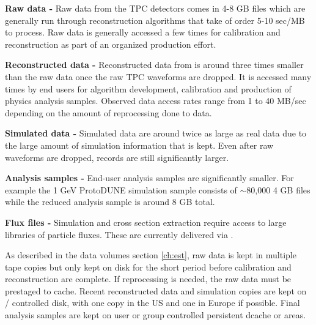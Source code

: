 \documentclass[../main-v1.tex]{subfiles}
\begin{document}
\begin{description}
    \item{\bf Raw data -}  Raw data from the TPC detectors comes in 4-8 GB files which are generally run through reconstruction algorithms that take of order 5-10 sec/MB to process. Raw data is generally accessed a few times for calibration and reconstruction as part of an organized production effort.  
    \item{\bf Reconstructed data -}  Reconstructed data from  is around three times smaller  than the raw data once the raw TPC waveforms are dropped. It is accessed many times by end users for algorithm development, calibration and production of physics analysis samples.   Observed data access rates range from 1 to 40 MB/sec depending on the amount of reprocessing done to data. 
    \item{\bf Simulated data - } Simulated data are around twice as large as real data due to the large amount of simulation information that is kept.  Even after raw waveforms are dropped, records are still significantly larger. 
    \item{\bf Analysis samples - } End-user analysis samples are significantly smaller.  For example the 1 GeV ProtoDUNE simulation sample consists of $\sim$80,000 4 GB files while the reduced analysis sample is around 8 GB total.  
    \item{\bf Flux files - } Simulation and cross section extraction require access to large libraries of particle fluxes.  These are currently delivered via . 
    
\end{description}

As described in the data volumes section \ref{ch:est}, raw data is kept in multiple tape copies but only kept on disk for the short period before calibration and reconstruction are complete.  If reprocessing is needed, the raw data must be prestaged to cache. Recent reconstructed data and simulation copies are kept on / controlled disk, with one copy in the US and one in Europe if possible. Final analysis samples are kept on user or group controlled persistent dcache or  areas. 
\end{document}
